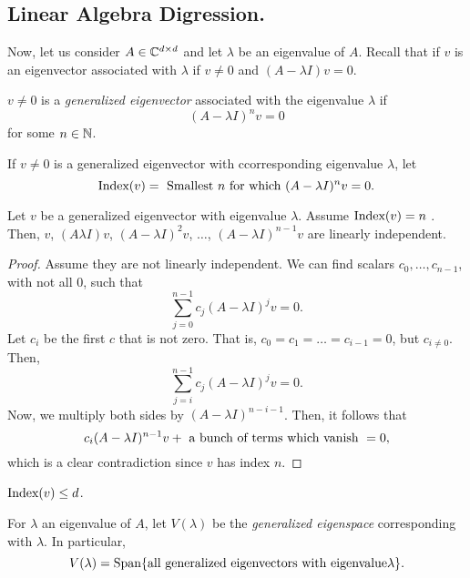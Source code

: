 \documentclass{article}
\begin{document}
\subsection*{Linear Algebra Digression.}

Now, let us consider $A \in \mathbb{C}^{d \times d}$ and let $\lambda$ be an eigenvalue of $A$. Recall that if $v$ is an eigenvector associated with $\lambda$ if $v \neq 0$ and $(A - \lambda I) v = 0$. 

\begin{definition}{}
    $v \neq 0$ is a \textit{generalized eigenvector} associated with the eigenvalue $\lambda$ if 
        \[
            (A - \lambda I)^n v = 0
        \]
    for some $n \in \mathbb{N}$. 
\end{definition}

\begin{definition}{}
    If $v \neq 0$ is a generalized eigenvector with ccorresponding eigenvalue $\lambda$, let 
        \[
            \text{Index}(v) = \text{ Smallest } n \text{ for which } (A - \lambda I)^n v = 0.
        \]
\end{definition}

\begin{theorem}[Claim.]{}
    Let $v$ be a generalized eigenvector with eigenvalue $\lambda$. Assume $\text{Index}(v) = n$ . Then, $v$, $(A \lambda I)v$, $(A - \lambda I)^2 v$, $\hdots$, $(A - \lambda I)^{n - 1} v$ are linearly independent. 
\end{theorem}
\begin{proof}
    Assume they are not linearly independent. We can find scalars $c_0, \hdots, c_{n - 1}$, with not all $0$, such that 
        \[\sum_{j = 0}^{n - 1} c_j (A - \lambda I)^j v = 0.\]
    Let $c_i$ be the first $c$ that is not zero. That is, $c_0 = c_1 = \hdots = c_{i - 1} = 0$, but $c_{i \neq 0}$. Then, 
        \[\sum_{j = i}^{n - 1} c_j (A - \lambda I)^j v = 0.\]
    Now, we multiply both sides by $(A - \lambda I)^{n - i - 1}$. Then, it follows that 
        \[
            c_i (A - \lambda I)^{ n - 1} v + \text{ a bunch of terms which vanish }= 0,
        \]
    which is a clear contradiction since $v$ has index $n$. 
\end{proof}


\begin{theorem}[Corollary.]{}
    $\text{Index}(v) \leq d$. 
\end{theorem}

\begin{definition}{}
    For $\lambda$ an eigenvalue of $A$, let $V(\lambda)$ be the \textit{generalized eigenspace} corresponding with $\lambda$. In particular, 
        \[
            V(\lambda) = \text{Span} \{\text{all generalized eigenvectors with eigenvalue} \lambda \}.
        \]
\end{definition}
\end{document}
